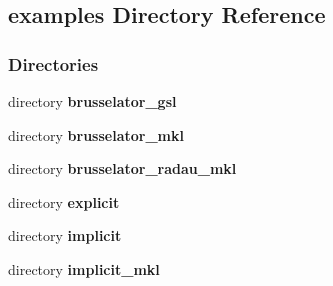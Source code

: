 \subsection{examples Directory Reference}
\label{dir_d28a4824dc47e487b107a5db32ef43c4}
\subsubsection*{Directories}
\begin{DoxyCompactItemize}
\item 
directory {\bf brusselator\+\_\+gsl}
\item 
directory {\bf brusselator\+\_\+mkl}
\item 
directory {\bf brusselator\+\_\+radau\+\_\+mkl}
\item 
directory {\bf explicit}
\item 
directory {\bf implicit}
\item 
directory {\bf implicit\+\_\+mkl}
\end{DoxyCompactItemize}
